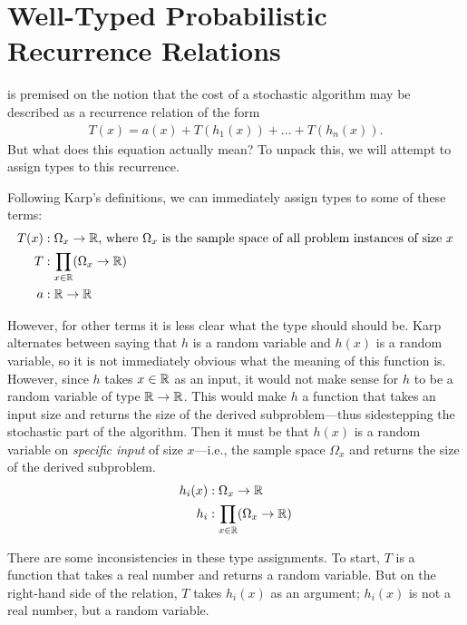 \chapter{Well-Typed Probabilistic Recurrence Relations}
\cite{Karp} is premised on the notion that the cost of a stochastic algorithm may be described as a
recurrence relation of the form
\begin{align*}
T(x) = a(x) + T(h_1(x)) + \dots + T(h_n(x)).
\end{align*}
But what does this equation actually mean? To unpack this, we will attempt to assign types to this recurrence.

 Following Karp's definitions, we can immediately assign types to some of these terms:
\begin{align*}
T(x) &: \Omega_x \rightarrow \mathbb{R} \text{, where } \Omega_x \text{ is the sample space of all problem instances of size } x \\
T &: \prod_{x \in \mathbb{R}} (\Omega_x \rightarrow \mathbb{R}) \\ 
a &: \mathbb{R} \rightarrow \mathbb{R}
\end{align*}

However, for other terms it is less clear what the type should should be. Karp alternates between saying that $h$ is a random 
variable and $h(x)$ is a random variable, so it is not immediately obvious 
what the meaning of this function is. However, since $h$ takes $x \in \mathbb{R}$ as an input, it would not make sense for $h$ to be a 
random variable of type $\mathbb{R} \rightarrow \mathbb{R}$. This would make $h$ a function that takes an input size and returns the 
size of the derived subproblem---thus sidestepping the stochastic part of the algorithm. Then it must be that $h(x)$ is a 
random variable on \emph{specific input} of size $x$---i.e., the sample space $\Omega_x$ and returns the size of the derived 
subproblem.
\begin{align*}
h_i(x) &: \Omega_x \rightarrow \mathbb{R} \\
h_i &: \prod_{x \in \mathbb{R}}(\Omega_x \rightarrow \mathbb{R}) 
\end{align*} 

There are some inconsistencies in these type assignments. To start, $T$ is a function that takes a real number and 
returns a random variable. But on the right-hand side of the relation, $T$ takes $h_i(x)$ as an argument; $h_i(x)$ is
not a real number, but a random variable. 

